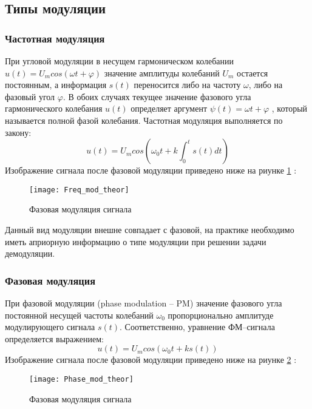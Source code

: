 \subsection{Типы модуляции}

\subsubsection{Частотная модуляция}
При угловой модуляции в несущем гармоническом колебании $u(t) = U_m cos(\omega t + \varphi)$  значение амплитуды колебаний $U_m$ остается постоянным, а информация $s(t)$ переносится либо на частоту $\omega$, либо на фазовый угол $\varphi$. В обоих случаях текущее значение фазового угла гармонического колебания $u(t)$ определяет аргумент $\psi (t) = \omega t + \varphi$ , который называется полной фазой колебания.
Частотная модуляция выполняется по закону: 
\begin{equation}
	u(t) = U_m cos(\omega_0 t + k \int_{0}^{t} s(t) dt)
\end{equation}
Изображение сигнала после фазовой модуляции приведено ниже на риунке \ref{pic:Freq_mod_theor} :
\begin{figure}[H]
	\begin{center}
		\texttt{[image: Freq\_mod\_theor]}
		\caption{Фазовая модуляция сигнала} 
		\label{pic:Freq_mod_theor} %
	\end{center}
\end{figure}
Данный вид модуляции внешне совпадает с фазовой, на практике необходимо иметь априорную информацию о типе модуляции при решении задачи демодуляции.

\subsubsection{Фазовая модуляция}
При фазовой модуляции (phase modulation – PM) значение фазового угла постоянной несущей частоты колебаний $\omega_0$ пропорционально амплитуде модулирующего сигнала $s(t)$. Соответственно, уравнение ФМ–сигнала определяется выражением: 
\begin{equation}
	u(t) = U_m cos(\omega_0 t + k s(t))
\end{equation}
Изображение сигнала после фазовой модуляции приведено ниже на риунке \ref{pic:Phase_mod_theor} :
\begin{figure}[H]
	\begin{center}
		\texttt{[image: Phase\_mod\_theor]}
		\caption{Фазовая модуляция сигнала} 
		\label{pic:Phase_mod_theor} %
	\end{center}
\end{figure}

